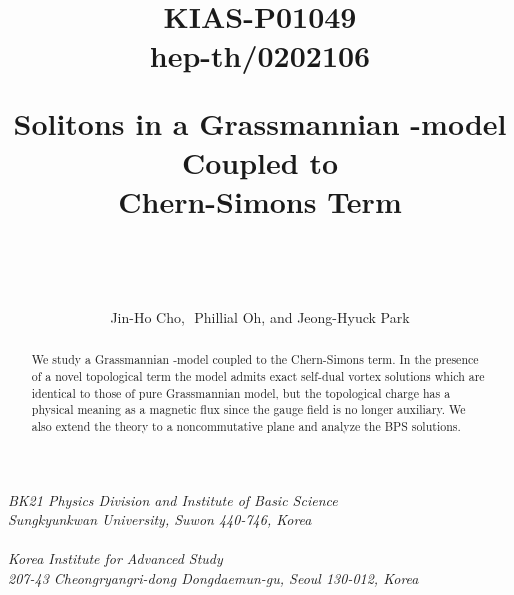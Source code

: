 \documentclass[a4paper,12pt]{article}
\begin{document}
\begin{titlepage}
\title{\vskip -60pt
{\small\begin{flushright}
KIAS-P01049\\
hep-th/0202106
\end{flushright}}
\vskip 45pt
Solitons in a Grassmannian \myHighlight{$\sigma$}\coordHE{}-model Coupled to\\ Chern-Simons Term\\}
\vspace{4.0cm}
\author{\\
\\
\\
Jin-Ho Cho,\coordHE{}\,\,
Phillial Oh,\coordHE{} and Jeong-Hyuck Park\coordHE{}}
\date{}
\maketitle
\begin{center}
\textit{\coordHE{}BK21 Physics Division and Institute of Basic Science\\
Sungkyunkwan University,
Suwon 440-746, Korea} \\
~\\
\textit{\coordHE{}Korea Institute for Advanced Study}\\
\textit{207-43 Cheongryangri-dong Dongdaemun-gu, Seoul 130-012, Korea}
\end{center}
\vspace{1.0cm}
\begin{abstract}
We study a Grassmannian \myHighlight{$\sigma$}\coordHE{}-model coupled to the Chern-Simons term. In the presence of a novel topological term the model admits exact self-dual
vortex solutions which are identical to those of pure Grassmannian model, but the topological charge has a physical meaning as a magnetic flux since the
gauge field is no longer auxiliary. We also extend the theory to a noncommutative plane and analyze the BPS solutions.
\end{abstract}
~\newline
~\newline
~\newline
~\newline
{}\coordHE{}
\thispagestyle{empty}
\end{titlepage}
\newpage
\setcounter{footnote}{0}
\end{document}
